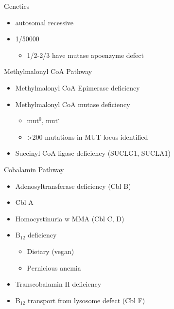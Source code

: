 \documentclass[presentation, smaller]{beamer}
\begin{document}
\begin{frame}[label={sec:orgheadline3}]{Genetics}
\begin{itemize}
\item autosomal recessive
\item 1/50000
\begin{itemize}
\item 1/2-2/3 have mutase apoenzyme defect
\end{itemize}
\end{itemize}
\begin{block}{Methylmalonyl CoA Pathway}
\begin{itemize}
\item Methylmalonyl CoA Epimerase deficiency
\item Methylmalonyl CoA mutase deficiency
\begin{itemize}
\item mut\(^{\text{0}}\), mut\(^{\text{-}}\)
\item >200 mutations in MUT locus identified
\end{itemize}
\item Succinyl CoA ligase deficiency (SUCLG1, SUCLA1)
\end{itemize}
\end{block}

\begin{block}{Cobalamin Pathway}
\begin{itemize}
\item Adenosyltransferase deficiency (Cbl B)
\item Cbl A
\item Homocystinuria w MMA (Cbl C, D)
\item B\(_{\text{12}}\) deficiency
\begin{itemize}
\item Dietary (vegan)
\item Pernicious anemia
\end{itemize}
\item Transcobalamin II deficiency
\item B\(_{\text{12}}\) transport from lysosome defect (Cbl F)
\end{itemize}
\end{block}
\end{frame}
\end{document}
